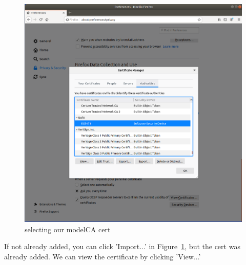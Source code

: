 \documentclass[12pt]{article}
\begin{document}
    \begin{figure}[H]
        \begin{center}
            \includegraphics[scale=0.5]{t4_6.png}
        \end{center}{}
        \caption{selecting our modelCA cert}
        \label{fig:t4_6}
    \end{figure}
    
If not already added, you can click 'Import...' in Figure~\ref{fig:t4_6}, but the cert was already added. We can view the certificate by clicking 'View...'
    
\end{document}
